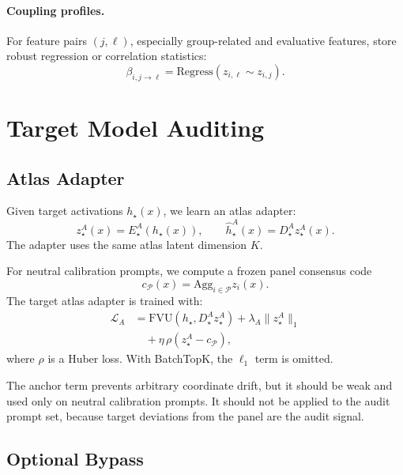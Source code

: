 \documentclass[11pt]{article}
\newcommand{\panel}{\mathcal{P}}
\newcommand{\fvu}{\mathrm{FVU}}
\newcommand{\agg}{\mathrm{Agg}}
\begin{document}
\paragraph{Coupling profiles.}
For feature pairs $(j,\ell)$, especially group-related and evaluative features, store robust regression or correlation statistics:
\begin{equation}
    \beta_{i,j\rightarrow \ell} = \mathrm{Regress}(z_{i,\ell}\sim z_{i,j}).
\end{equation}

\section{Target Model Auditing}

\subsection{Atlas Adapter}

Given target activations $h_\star(x)$, we learn an atlas adapter:
\begin{equation}
    z_\star^A(x)=E_\star^A(h_\star(x)), \qquad \hat h_\star^A(x)=D_\star^A z_\star^A(x).
\end{equation}
The adapter uses the same atlas latent dimension $K$.

For neutral calibration prompts, we compute a frozen panel consensus code
\begin{equation}
    c_{\panel}(x)=\agg_{i\in\panel} z_i(x).
\end{equation}
The target atlas adapter is trained with:
\begin{equation}
\boxed{
    \begin{aligned}
    \mathcal{L}_{A}
    &= \fvu(h_\star,D_\star^A z_\star^A)
    + \lambda_A \|z_\star^A\|_1\\
    &\quad + \eta\,\rho(z_\star^A-c_{\panel}),
    \end{aligned}
}
\label{eq:target-atlas}
\end{equation}
where $\rho$ is a Huber loss. With BatchTopK, the $\ell_1$ term is omitted.

The anchor term prevents arbitrary coordinate drift, but it should be weak and used only on neutral calibration prompts. It should not be applied to the audit prompt set, because target deviations from the panel are the audit signal.

\subsection{Optional Bypass}
\end{document}
